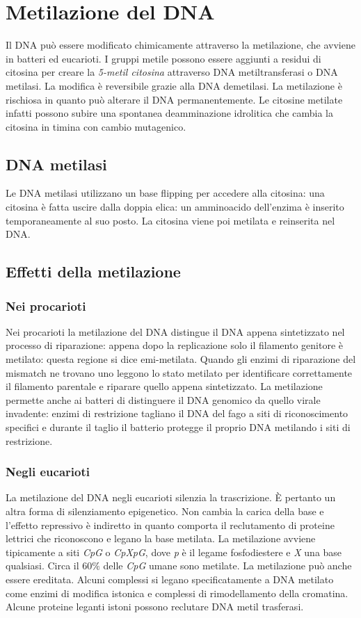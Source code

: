 \section{Metilazione del DNA}
Il DNA pu\`o essere modificato chimicamente attraverso la metilazione, che avviene in batteri ed eucarioti. I gruppi metile possono essere aggiunti a residui di citosina per 
creare la \emph{5-metil citosina} attraverso DNA metiltransferasi o DNA metilasi. La modifica \`e reversibile grazie alla DNA demetilasi. La metilazione \`e rischiosa in quanto pu\`o 
alterare il DNA permanentemente. Le citosine metilate infatti possono subire una spontanea deamminazione idrolitica che cambia la citosina in timina con cambio mutagenico. 
\subsection{DNA metilasi}
Le DNA metilasi utilizzano un base flipping per accedere alla citosina: una citosina \`e fatta uscire dalla doppia elica: un amminoacido dell'enzima \`e inserito temporaneamente al 
suo posto. La citosina viene poi metilata e reinserita nel DNA. 
\subsection{Effetti della metilazione}
\subsubsection{Nei procarioti}
Nei procarioti la metilazione del DNA distingue il DNA appena sintetizzato nel processo di riparazione: appena dopo la replicazione solo il filamento genitore \`e metilato: questa
regione si dice emi-metilata. Quando gli enzimi di riparazione del mismatch ne trovano uno leggono lo stato metilato per identificare correttamente il filamento parentale e riparare
quello appena sintetizzato. La metilazione permette anche ai batteri di distinguere il DNA genomico da quello virale invadente: enzimi di restrizione tagliano il DNA del fago a 
siti di riconoscimento specifici e durante il taglio il batterio protegge il proprio DNA metilando i siti di restrizione. 
\subsubsection{Negli eucarioti}
La metilazione del DNA negli eucarioti silenzia la trascrizione. \`E pertanto un altra forma di silenziamento epigenetico. Non cambia la carica della base e l'effetto repressivo \`e
indiretto in quanto comporta il reclutamento di proteine lettrici che riconoscono e legano la base metilata. La metilazione avviene tipicamente a siti \emph{CpG} o \emph{CpXpG}, dove
\emph{p} \`e il legame fosfodiestere e \emph{X} una base qualsiasi. Circa il $60\%$ delle \emph{CpG} umane sono metilate. La metilazione pu\`o anche essere ereditata. Alcuni complessi
si legano specificatamente a DNA metilato come enzimi di modifica istonica e complessi di rimodellamento della cromatina. Alcune proteine leganti istoni possono reclutare DNA
metil trasferasi. 
